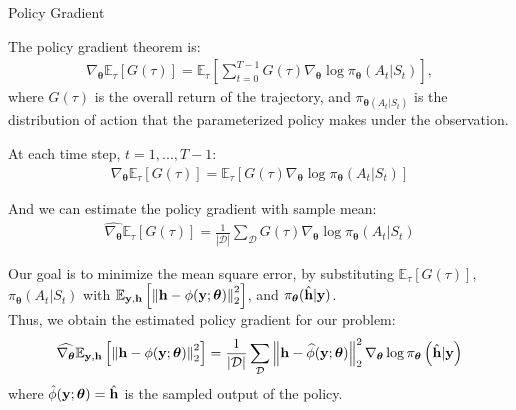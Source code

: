 \documentclass[hyperref={bookmarks=false}]{beamer}
\numberwithin{figure}{section}
\begin{document}
\begin{frame}[allowframebreaks]{Policy Gradient}

The policy gradient theorem is:
\begin{align*}
    \nabla_{\boldsymbol{\theta}}\mathbb{E}_{\tau}[G(\tau)]
        =\mathbb{E}_{\tau}\left[\sum\limits_{t=0}^{T-1}G(\tau)
        \nabla_{\boldsymbol{\theta}}\log{\pi_{\boldsymbol{\theta}}
        (A_t|S_t)}\right],
\end{align*}
where $G(\tau)$ is the overall return of the trajectory, and $\pi_{\boldsymbol{\theta}(A_t|S_t)}$ is the distribution of action that 
        the parameterized policy makes under the observation. 

At each time step, $t=1,...,T-1$:
\begin{align*}
    \nabla_{\boldsymbol{\theta}}\mathbb{E}_{\tau}[G(\tau)]
        =\mathbb{E}_{\tau}\left[G(\tau)
        \nabla_{\boldsymbol{\theta}}\log{\pi_{\boldsymbol{\theta}}
        (A_t|S_t)}\right]
\end{align*}

And we can estimate the policy gradient with sample mean:
\begin{align*}
    \widehat{\nabla_{\boldsymbol{\theta}}}\mathbb{E}_{\tau}[G(\tau)]
        =\frac{1}{\left| \mathcal{D}  \right|} \sum\limits_{\mathcal{D}}
        G(\tau)\nabla_{\boldsymbol{\theta}}\log{\pi_{\boldsymbol{\theta}}
        (A_t|S_t)}
\end{align*}

\framebreak

Our goal is to minimize the mean square error, by substituting 
$\mathbb{E}_{\tau}[G(\tau)]$, $\pi_{\boldsymbol{\theta}}(A_t|S_t)$ with 
$\mathbb{E}_{{\bf y},{\bf h}}\left[\left\| {\bf h}-\phi(\mathbf{y};\boldsymbol{\theta}) \right\|^2_2 \right]$,
and $\pi_{\boldsymbol{\theta}}(\hat{{\bf h}}|{\bf y})$.\\
Thus, we obtain the estimated policy gradient for our problem:
\begin{equation} \label{policy gradient}
    \widehat{\nabla_{\boldsymbol{\theta}}}
            \mathbb{E}_{{\bf y},{\bf h}}\left[\left\| {\bf h}-\phi(\mathbf{y};\boldsymbol{\theta}) \right\|^2_2 \right]
            = \frac{1}{\left| \mathcal{D}  \right|} \sum\limits_{\mathcal{D}}
            \left\| {\bf h}-\widehat{\phi}(\mathbf{y};\boldsymbol{\theta}) \right\|^2_2
            \nabla_{\boldsymbol{\theta}}
            \log \pi_{\boldsymbol{\theta}}
            \left( \hat{{\bf h}}|{\bf y} \right)
\end{equation}
where $\hat{\phi}(\mathbf{y};\boldsymbol{\theta}) = 
\hat{{\bf h}}$ is the sampled output of the policy. 

\end{frame}
\end{document}
